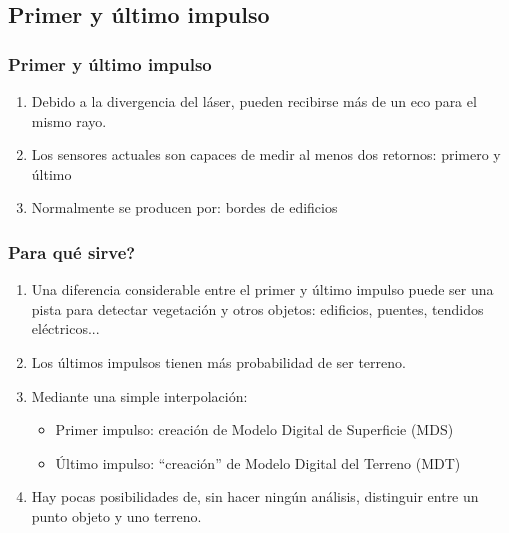 \subsection{Primer y último impulso}
\begin{frame}[label=firstlast1]
    \frametitle{Primer y último impulso}
    \begin{enumerate}[<+->]
        \item Debido a la divergencia del láser, pueden recibirse \alert<1>{más de un eco} para el mismo rayo.
	\item Los sensores actuales son capaces de medir al menos dos retornos: \alert<2>{primero} y \alert<2>{último}
	\item Normalmente se producen por: \alert<3>{bordes} de edificios \uncover<4->{o \alert<4>{vegetación}}
    \end{enumerate}
   \begin{center}
   \end{center}
\end{frame}
\begin{frame}
    \frametitle{\textquestiondown Para qué sirve?}
    \begin{enumerate}[<+->]
     \item Una diferencia considerable entre el primer y último impulso puede ser una pista para detectar vegetación y otros objetos: edificios, puentes, tendidos eléctricos...
     \item Los últimos impulsos tienen más probabilidad de ser terreno.
     \item Mediante una simple interpolación:
     	\begin{itemize}
     	   \item Primer impulso: creación de Modelo Digital de Superficie (\alert<4>{MDS})
     	   \item \'Ultimo impulso: ``creación'' de Modelo Digital del Terreno (\alert<5>{MDT})
     	\end{itemize}
     \item Hay pocas posibilidades de, sin hacer ningún análisis, distinguir entre un punto \alert<6>{objeto} y uno \alert<6>{terreno}.
    \end{enumerate}
\end{frame}
